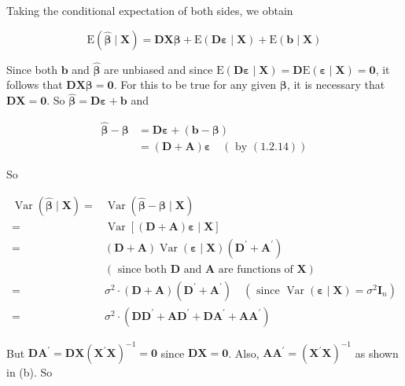 \documentclass[10pt]{article}
\begin{document}
Taking the conditional expectation of both sides, we obtain

$$
\mathrm{E}(\widehat{\boldsymbol{\beta}} \mid \mathbf{X})=\mathbf{D} \mathbf{X} \boldsymbol{\beta}+\mathrm{E}(\mathbf{D} \boldsymbol{\varepsilon} \mid \mathbf{X})+\mathrm{E}(\mathbf{b} \mid \mathbf{X})
$$

Since both $\mathbf{b}$ and $\widehat{\boldsymbol{\beta}}$ are unbiased and since $\mathrm{E}(\mathbf{D} \boldsymbol{\varepsilon} \mid \mathbf{X})=\mathbf{D} \mathrm{E}(\boldsymbol{\varepsilon} \mid \mathbf{X})=\mathbf{0}$, it follows that $\mathbf{D X} \boldsymbol{\beta}=\mathbf{0}$. For this to be true for any given $\boldsymbol{\beta}$, it is necessary that $\mathbf{D X}=\mathbf{0}$. So $\widehat{\boldsymbol{\beta}}=\mathbf{D} \boldsymbol{\varepsilon}+\mathbf{b}$ and

$$
\begin{aligned}
\widehat{\boldsymbol{\beta}}-\boldsymbol{\beta} & =\mathbf{D} \boldsymbol{\varepsilon}+(\mathbf{b}-\boldsymbol{\beta}) \\
& =(\mathbf{D}+\mathbf{A}) \boldsymbol{\varepsilon} \quad(\text { by }(1.2 .14))
\end{aligned}
$$

So

$$
\begin{aligned}
\operatorname{Var}(\widehat{\boldsymbol{\beta}} \mid \mathbf{X})= & \operatorname{Var}(\widehat{\boldsymbol{\beta}}-\boldsymbol{\beta} \mid \mathbf{X}) \\
= & \operatorname{Var}[(\mathbf{D}+\mathbf{A}) \boldsymbol{\varepsilon} \mid \mathbf{X}] \\
= & (\mathbf{D}+\mathbf{A}) \operatorname{Var}(\boldsymbol{\varepsilon} \mid \mathbf{X})\left(\mathbf{D}^{\prime}+\mathbf{A}^{\prime}\right) \\
& (\text { since both } \mathbf{D} \text { and } \mathbf{A} \text { are functions of } \mathbf{X}) \\
= & \sigma^{2} \cdot(\mathbf{D}+\mathbf{A})\left(\mathbf{D}^{\prime}+\mathbf{A}^{\prime}\right) \quad\left(\text { since } \operatorname{Var}(\boldsymbol{\varepsilon} \mid \mathbf{X})=\sigma^{2} \mathbf{I}_{n}\right) \\
= & \sigma^{2} \cdot\left(\mathbf{D} \mathbf{D}^{\prime}+\mathbf{A D}^{\prime}+\mathbf{D A}^{\prime}+\mathbf{A} \mathbf{A}^{\prime}\right)
\end{aligned}
$$

But $\mathbf{D A}^{\prime}=\mathbf{D X}\left(\mathbf{X}^{\prime} \mathbf{X}\right)^{-1}=\mathbf{0}$ since $\mathbf{D X}=\mathbf{0}$. Also, $\mathbf{A A}^{\prime}=\left(\mathbf{X}^{\prime} \mathbf{X}\right)^{-1}$ as shown in (b). So
\end{document}

